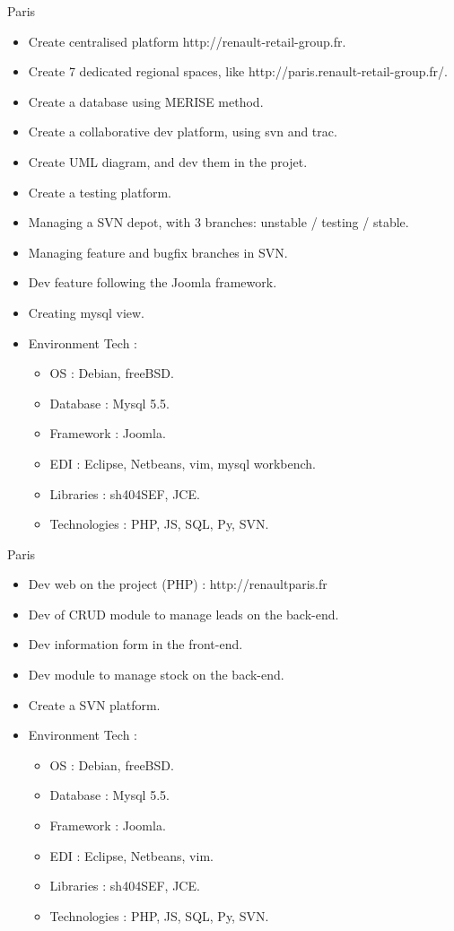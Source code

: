 \documentclass[10pt,a4paper,sans]{moderncv}
\begin{document}
\vskip 1cm
\vskip 5cm

{Paris}{
  \begin{itemize}%
    \item Create centralised platform http://renault-retail-group.fr.
    \item Create 7 dedicated regional spaces, like http://paris.renault-retail-group.fr/.
    \item Create a database using MERISE method.
    \item Create a collaborative dev platform, using svn and trac.
    \item Create UML diagram, and dev them in the projet.
    \item Create a testing platform.
    \item Managing a SVN depot, with 3 branches: unstable / testing / stable.
    \item Managing feature and bugfix branches in SVN.
    \item Dev feature following the Joomla framework.
    \item Creating mysql view.
    \item Environment Tech :
      \begin{itemize}%
        \item OS : Debian, freeBSD.
        \item Database : Mysql 5.5.
        \item Framework : Joomla.
        \item EDI : Eclipse, Netbeans, vim, mysql workbench.
        \item Libraries : sh404SEF, JCE.
        \item Technologies : PHP, JS, SQL, Py, SVN.
      \end{itemize}
  \end{itemize}}

\vskip 1cm

{Paris}{
  \begin{itemize}%
    \item Dev web on the project (PHP) : http://renaultparis.fr
    \item Dev of CRUD module to manage leads on the back-end.
    \item Dev information form in the front-end.
    \item Dev module to manage stock on the back-end.
    \item Create a SVN platform.
    \item Environment Tech :
      \begin{itemize}%
        \item OS : Debian, freeBSD.
        \item Database : Mysql 5.5.
        \item Framework : Joomla.
        \item EDI : Eclipse, Netbeans, vim.
        \item Libraries : sh404SEF, JCE.
        \item Technologies : PHP, JS, SQL, Py, SVN.
      \end{itemize}
  \end{itemize}}
\end{document}
